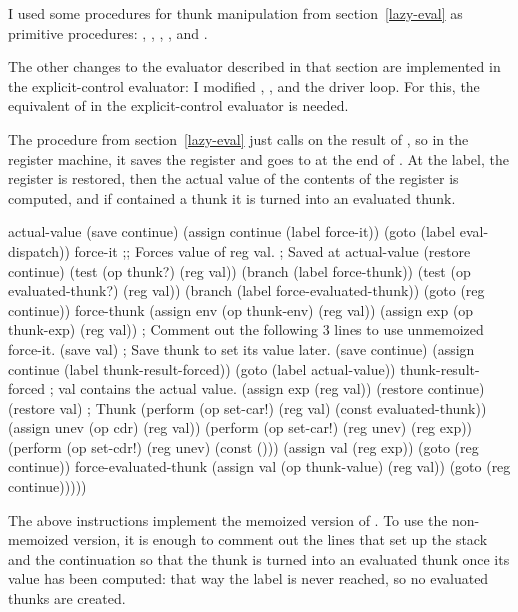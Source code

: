 \begin{exe}[5.25]
    I used some procedures for thunk manipulation from section~\ref{lazy-eval} 
    as primitive procedures: , , , 
    ,  and .

    The other changes to the evaluator described in that section are implemented 
    in the explicit-control evaluator: I modified , 
    ,  and the driver loop. For this, the 
    equivalent of  in the explicit-control evaluator is 
    needed.

    The  procedure from section~\ref{lazy-eval} just calls 
     on the result of , so in the register machine, it 
    saves the  register and goes to  at the end of 
    . At the  label, the  
    register is restored, then the actual value of the contents of the 
     register is computed, and if  contained a thunk it is 
    turned into an evaluated thunk.
    \begin{cscm}
    actual-value
        (save continue)
        (assign continue (label force-it))
        (goto (label eval-dispatch))
    force-it
        ;; Forces value of reg val.
        ; Saved at actual-value
        (restore continue)
        (test (op thunk?) (reg val))
        (branch (label force-thunk))
        (test (op evaluated-thunk?) (reg val))
        (branch (label force-evaluated-thunk))
        (goto (reg continue))
    force-thunk
        (assign env (op thunk-env) (reg val))
        (assign exp (op thunk-exp) (reg val))
        ; Comment out the following 3 lines to use unmemoized force-it.
        (save val) ; Save thunk to set its value later.
        (save continue)
        (assign continue (label thunk-result-forced))
        (goto (label actual-value))
    thunk-result-forced
        ; val contains the actual value.
        (assign exp (reg val))
        (restore continue)
        (restore val) ; Thunk
        (perform (op set-car!) (reg val) (const evaluated-thunk))
        (assign unev (op cdr) (reg val))
        (perform (op set-car!) (reg unev) (reg exp))
        (perform (op set-cdr!) (reg unev) (const ()))
        (assign val (reg exp))
        (goto (reg continue))
    force-evaluated-thunk
        (assign val (op thunk-value) (reg val))
        (goto (reg continue)))))
    \end{cscm}
    The above instructions implement the memoized version of . To 
    use the non-memoized version, it is enough to comment out the lines that set 
    up the stack and the continuation so that the thunk is turned into an 
    evaluated thunk once its value has been computed: that way the 
     label is never reached, so no evaluated thunks 
    are created.


\end{exe}
